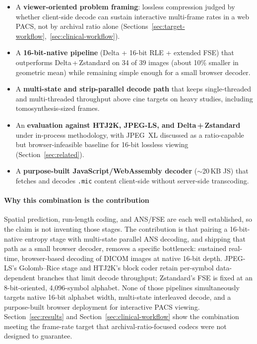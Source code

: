 \documentclass[journal]{IEEEtran}
\begin{document}
\begin{itemize}
  \item A \textbf{viewer-oriented problem framing}: lossless compression judged
  by whether client-side decode can sustain interactive multi-frame rates in a
  web PACS, not by archival ratio alone
  (Sections~\ref{sec:target-workflow},~\ref{sec:clinical-workflow}).
  \item A \textbf{16-bit-native pipeline} (Delta + 16-bit RLE + extended FSE)
  that outperforms Delta\,+\,Zstandard on 34 of 39 images (about 10\% smaller in
  geometric mean) while remaining simple enough for a small browser decoder.
  \item A \textbf{multi-state and strip-parallel decode path} that keeps
  single-threaded and multi-threaded throughput above cine targets on heavy
  studies, including tomosynthesis-sized frames.
  \item An \textbf{evaluation against HTJ2K, JPEG-LS, and Delta\,+\,Zstandard}
  under in-process methodology, with JPEG~XL discussed as a ratio-capable but
  browser-infeasible baseline for 16-bit lossless viewing
  (Section~\ref{sec:related}).
  \item A \textbf{purpose-built JavaScript/WebAssembly decoder} (${\sim}$20\,KB
  JS) that fetches and decodes \texttt{.mic} content client-side without
  server-side transcoding.
\end{itemize}

\paragraph{Why this combination is the contribution}
Spatial prediction, run-length coding, and ANS/FSE are each well established, so
the claim is not inventing those stages. The contribution is that pairing a
16-bit-native entropy stage with multi-state parallel ANS decoding, and shipping
that path as a small browser decoder, removes a specific bottleneck: sustained
real-time, browser-based decoding of DICOM images at native 16-bit depth.
JPEG-LS's Golomb--Rice stage and HTJ2K's block coder retain per-symbol
data-dependent branches that limit decode throughput; Zstandard's FSE is fixed
at an 8-bit-oriented, 4,096-symbol alphabet. None of those pipelines
simultaneously targets native 16-bit alphabet width, multi-state interleaved
decode, and a purpose-built browser deployment for interactive PACS viewing.
Section~\ref{sec:results} and Section~\ref{sec:clinical-workflow} show the
combination meeting the frame-rate target that archival-ratio-focused codecs
were not designed to guarantee.
\end{document}
